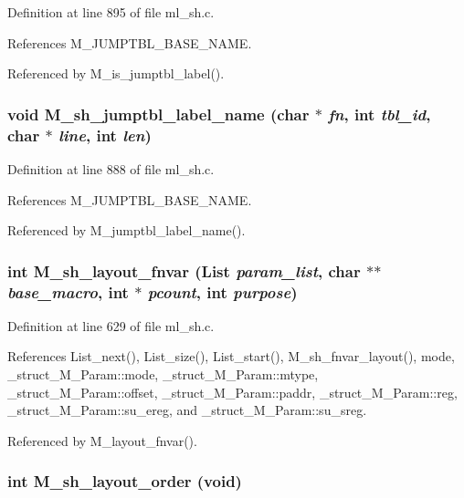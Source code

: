 Definition at line 895 of file ml\_\-sh.c.

References M\_\-JUMPTBL\_\-BASE\_\-NAME.

Referenced by M\_\-is\_\-jumptbl\_\-label().
\subsubsection{\setlength{\rightskip}{0pt plus 5cm}void M\_\-sh\_\-jumptbl\_\-label\_\-name (char $\ast$ {\em fn}, int {\em tbl\_\-id}, char $\ast$ {\em line}, int {\em len})}\label{m__sh_8h_57ef07dfc1f52b28ef9ab0be4b0c8046}




Definition at line 888 of file ml\_\-sh.c.

References M\_\-JUMPTBL\_\-BASE\_\-NAME.

Referenced by M\_\-jumptbl\_\-label\_\-name().
\subsubsection{\setlength{\rightskip}{0pt plus 5cm}int M\_\-sh\_\-layout\_\-fnvar (\bf{List} {\em param\_\-list}, char $\ast$$\ast$ {\em base\_\-macro}, int $\ast$ {\em pcount}, int {\em purpose})}\label{m__sh_8h_21bdc6be810e4aa377bc8734303ba126}




Definition at line 629 of file ml\_\-sh.c.

References List\_\-next(), List\_\-size(), List\_\-start(), M\_\-sh\_\-fnvar\_\-layout(), mode, \_\-struct\_\-M\_\-Param::mode, \_\-struct\_\-M\_\-Param::mtype, \_\-struct\_\-M\_\-Param::offset, \_\-struct\_\-M\_\-Param::paddr, \_\-struct\_\-M\_\-Param::reg, \_\-struct\_\-M\_\-Param::su\_\-ereg, and \_\-struct\_\-M\_\-Param::su\_\-sreg.

Referenced by M\_\-layout\_\-fnvar().
\subsubsection{\setlength{\rightskip}{0pt plus 5cm}int M\_\-sh\_\-layout\_\-order (void)}\label{m__sh_8h_ce450ce307a8ddc762175371fd13e126}




